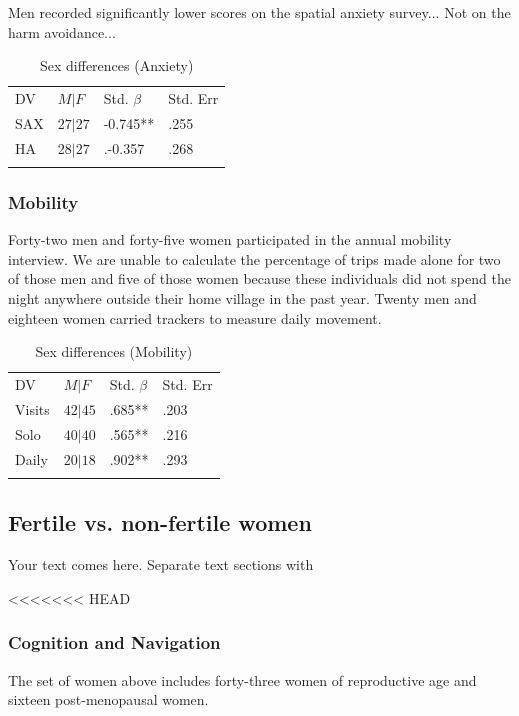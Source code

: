 Men recorded significantly lower scores on the spatial anxiety survey... Not on the harm avoidance...

\begin{table}
\caption{Sex differences (Anxiety)}
\label{tab:sd_anx}  
\begin{tabular}{llll}
\hline\noalign{\smallskip}
DV & $M|F$ & Std. $\beta$ & Std. Err  \\
\noalign{\smallskip}\hline\noalign{\smallskip}
SAX & $27|27$ & -0.745** & .255 \\
HA & $28|27$ & .-0.357 & .268 \\
\noalign{\smallskip}\hline
\end{tabular}
\end{table}

		\subsubsection{Mobility}
		\label{sec:3.1.2}
Forty-two men and forty-five women participated in the annual mobility interview. We are unable to calculate the percentage of trips made alone for two of those men and five of those women because these individuals did not spend the night anywhere outside their home village in the past year.  Twenty men and eighteen women carried trackers to measure daily movement.

\begin{table}
\caption{Sex differences (Mobility)}
\label{tab:sd_mob}  
\begin{tabular}{llll}
\hline\noalign{\smallskip}
DV & $M|F$ & Std. $\beta$ & Std. Err  \\
\noalign{\smallskip}\hline\noalign{\smallskip}
Visits & $42|45$ & .685** & .203 \\
Solo & $40|40$ & .565** & .216 \\
Daily & $20|18$ & .902** & .293 \\
\noalign{\smallskip}\hline
\end{tabular}
\end{table}

	\subsection{Fertile vs. non-fertile women}
	\label{sec:3.2}
Your text comes here. Separate text sections with

<<<<<<< HEAD
		\subsubsection{Cognition and Navigation}
		\label{sec:3.2.1}
The set of women above includes forty-three women of reproductive age and sixteen post-menopausal women.

